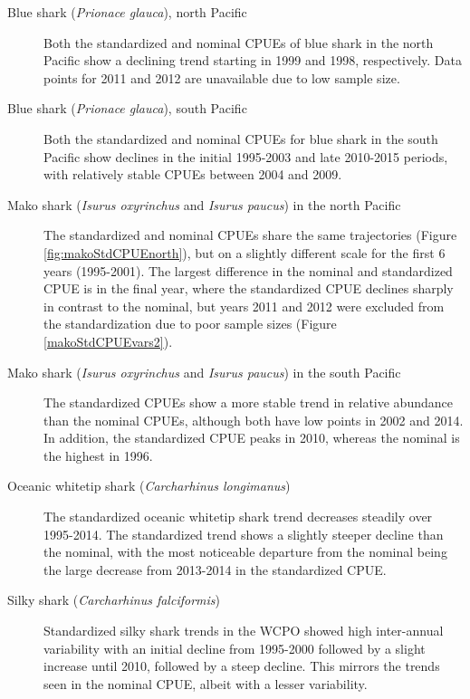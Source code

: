 \begin{description}
\item[Blue shark (\emph{Prionace glauca}), north Pacific] Both the standardized and nominal CPUEs of blue shark in the north Pacific show a declining trend starting in 1999 and 1998, respectively. Data points for 2011 and 2012 are unavailable due to low sample size.  
 
 \item[Blue shark (\emph{Prionace glauca}), south Pacific]  Both the standardized and nominal CPUEs for blue shark in the south Pacific show declines in the initial 1995-2003 and late 2010-2015 periods, with relatively stable CPUEs between 2004  and 2009.  
 
 \item[Mako shark (\emph{Isurus oxyrinchus} and \emph{Isurus paucus}) in the north Pacific] The standardized and nominal CPUEs share the same trajectories (Figure \ref{fig:makoStdCPUEnorth}), but on a slightly different scale for the first 6 years (1995-2001).  The largest difference in the nominal and standardized CPUE is in the final year, where the standardized CPUE declines sharply in contrast to the nominal, but years 2011 and 2012 were excluded from the standardization due to poor sample sizes (Figure \ref{makoStdCPUEvars2}).
 
\item[Mako shark (\emph{Isurus oxyrinchus} and \emph{Isurus paucus}) in the south Pacific] The standardized CPUEs show a more stable trend in relative abundance than the nominal CPUEs, although both have low points in 2002 and 2014. In addition, the standardized CPUE peaks in 2010, whereas the nominal is the highest in 1996.  
 
\item[Oceanic whitetip shark (\emph{Carcharhinus longimanus})] The standardized oceanic whitetip shark trend decreases steadily over 1995-2014.  The standardized trend shows a slightly steeper decline than the nominal, with the most noticeable departure from the nominal being the large decrease from 2013-2014 in the standardized CPUE.%
 
 \item[Silky shark (\emph{Carcharhinus falciformis})] Standardized silky shark trends in the WCPO showed high inter-annual variability with an initial decline from 1995-2000 followed by a slight increase until 2010, followed by a steep decline. This mirrors the trends seen in the nominal CPUE, albeit with a lesser variability.
 

\end{description}
